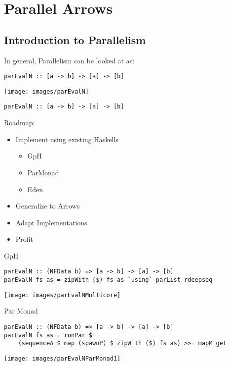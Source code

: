 \section{Parallel Arrows}
\subsection{Introduction to Parallelism}
\begin{frame}[fragile]
In general, Parallelism can be looked at as:
\begin{lstlisting}[frame=htrbl]
parEvalN :: [a -> b] -> [a] -> [b]
\end{lstlisting}
\begin{center}
\texttt{[image: images/parEvalN]}
\end{center}
\end{frame}
\begin{frame}[fragile]
\begin{lstlisting}[frame=htrbl]
parEvalN :: [a -> b] -> [a] -> [b]
\end{lstlisting}
Roadmap:
\begin{itemize}
\item Implement using existing Haskells
\begin{itemize}
\item GpH
\item ParMonad
\item Eden
\end{itemize}
\item Generalize to Arrows
\item Adapt Implementations
\item Profit
\end{itemize}
\end{frame}

\begin{frame}[fragile]{GpH}
\begin{lstlisting}[frame=htrbl]
parEvalN :: (NFData b) => [a -> b] -> [a] -> [b]
parEvalN fs as = zipWith ($) fs as `using` parList rdeepseq
\end{lstlisting}
\begin{center}
	\texttt{[image: images/parEvalNMulticore]}
\end{center}
\end{frame}

\begin{frame}[fragile]{Par Monad}
\begin{lstlisting}[frame=htrbl]
parEvalN :: (NFData b) => [a -> b] -> [a] -> [b]
parEvalN fs as = runPar $ 
	(sequenceA $ map (spawnP) $ zipWith ($) fs as) >>= mapM get
\end{lstlisting}
\begin{center}
\texttt{[image: images/parEvalNParMonad1]}
\end{center}
\end{frame}


